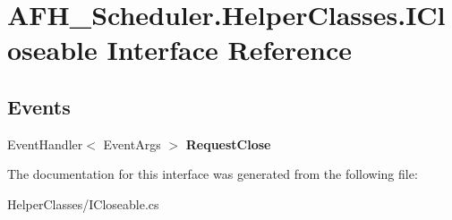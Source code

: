 \section{A\+F\+H\+\_\+\+Scheduler.\+Helper\+Classes.\+I\+Closeable Interface Reference}
\label{interface_a_f_h___scheduler_1_1_helper_classes_1_1_i_closeable}
\subsection*{Events}
\begin{DoxyCompactItemize}
\item 
\mbox{\label{interface_a_f_h___scheduler_1_1_helper_classes_1_1_i_closeable_ad330316fcb85fe36c07d9268c4ec8293}} 
Event\+Handler$<$ Event\+Args $>$ {\bfseries Request\+Close}
\end{DoxyCompactItemize}


The documentation for this interface was generated from the following file\+:\begin{DoxyCompactItemize}
\item 
Helper\+Classes/I\+Closeable.\+cs\end{DoxyCompactItemize}
